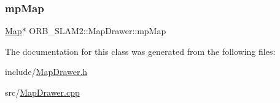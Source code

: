 \subsubsection{\texorpdfstring{mp\+Map}{mpMap}}
{\footnotesize\ttfamily \mbox{\hyperlink{class_o_r_b___s_l_a_m2_1_1_map}{Map}}$\ast$ O\+R\+B\+\_\+\+S\+L\+A\+M2\+::\+Map\+Drawer\+::mp\+Map}



The documentation for this class was generated from the following files\+:\begin{DoxyCompactItemize}
\item 
include/\mbox{\hyperlink{_map_drawer_8h}{Map\+Drawer.\+h}}\item 
src/\mbox{\hyperlink{_map_drawer_8cpp}{Map\+Drawer.\+cpp}}\end{DoxyCompactItemize}
